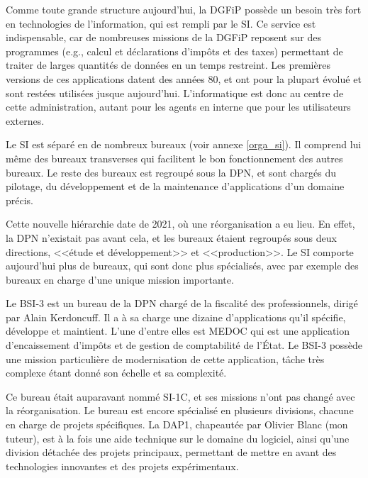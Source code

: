 \documentclass[openany, 11pt]{memoir}
\begin{document}
\bigskip
Comme toute grande structure aujourd'hui, la \gls{DGFiP} possède un besoin très fort en technologies de l'information, qui est rempli par le \gls{SI}. Ce service est indispensable, car de nombreuses missions de la DGFiP reposent sur des programmes (e.g., calcul et déclarations d'impôts et des taxes) permettant de traiter de larges quantités de données en un temps restreint. Les premières versions de ces applications datent des années 80, et ont pour la plupart évolué et sont restées utilisées jusque aujourd'hui. L'informatique est donc au centre de cette administration, autant pour les agents en interne que pour les utilisateurs externes.

Le \gls{SI} est séparé en de nombreux bureaux (voir annexe \ref{orga_si}). Il comprend lui même des bureaux \glspl{transverse} qui facilitent le bon fonctionnement des autres bureaux. Le reste des bureaux est regroupé sous la \gls{DPN}, et sont chargés du pilotage, du développement et de la maintenance d'applications d'un domaine précis.

Cette nouvelle hiérarchie date de 2021, où une réorganisation a eu lieu. En effet, la \gls{DPN} n'existait pas avant cela, et les bureaux étaient regroupés sous deux directions, <<étude et développement>> et <<production>>. Le \gls{SI} comporte aujourd'hui plus de bureaux, qui sont donc plus spécialisés, avec par exemple des bureaux en charge d'une unique mission importante.

\bigskip
Le \gls{BSI-3} est un bureau de la \gls{DPN} chargé de la fiscalité des professionnels, dirigé par Alain Kerdoncuff. Il a à sa charge une dizaine d'applications qu'il spécifie, développe et maintient. L'une d'entre elles est \gls{MEDOC} qui est une application d'encaissement d'impôts et de gestion de comptabilité de l'État. Le \gls{BSI-3} possède une mission particulière de modernisation de cette application, tâche très complexe étant donné son échelle et sa complexité.

Ce bureau était auparavant nommé SI-1C, et ses missions n'ont pas changé avec la réorganisation. Le bureau est encore spécialisé en plusieurs divisions, chacune en charge de projets spécifiques. La \gls{DAP1}, chapeautée par Olivier Blanc (mon tuteur), est à la fois une aide technique sur le domaine du logiciel, ainsi qu'une division détachée des projets principaux, permettant de mettre en avant des technologies innovantes et des projets expérimentaux.

\end{document}
